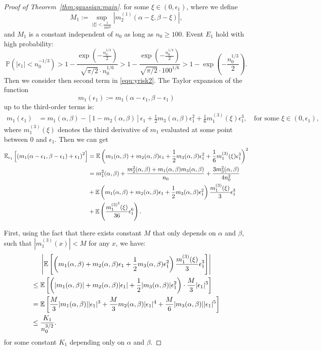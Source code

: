 \begin{proof}[Proof of Theorem~\ref{thm:gaussian:main}]
    for some \( \xi \in (0, \epsilon_1) \), where we define 
    \[
    M_1 := \sup_{|\xi| < \frac{1}{100^{\frac{1}{3}}}} \left| m_2^{(1)}(\alpha - \xi, \beta - \xi) \right|,
    \]
    and \( M_1 \) is a constant independent of \( n_0 \) as long as \( n_0 \geq 100\).
Event $E_1$ hold with high probability:
\[
\mathbb{P}\left(|\epsilon_1| < n_0^{-1/3}\right) >1- \frac{\exp\left(-\frac{n_0^{1/3}}{2}\right)}{\sqrt{\pi / 2} \cdot n_0^{1/6}} >1- \frac{\exp\left(-\frac{n_0^{1/3}}{2}\right)}{\sqrt{\pi / 2} \cdot 100^{1/6}} >  1-\exp\left(-\frac{n_0^{1/3}}{2}\right).
\]
Then we consider then second term in \ref{equ:yrisk2}. The Taylor expansion of the function
\[
m_1(\epsilon_1) := m_1(\alpha - \epsilon_1, \beta - \epsilon_1)
\]
up to the third-order terms is:
\begin{align}\label{equ:taylor}
m_1(\epsilon_1) 
&= m_1(\alpha,\beta) - \left[ 1 - m_2(\alpha, \beta) \right] \epsilon_1 +\frac{1}{2}m_3(\alpha,\beta) \epsilon_1^2 + \frac{1}{6} m_1^{(3)}(\xi) \epsilon_1^3, \quad \text{for some } \xi \in (0, \epsilon_1),
\end{align}
where \( m_1^{(3)}(\xi) \) denotes the third derivative of \(m_1\) evaluated at some point between \(0\) and \(\epsilon_1\).
Then we can get 
\begin{align}
    \mathbb{E}_{\epsilon_1} \left[ \left(m_1(\alpha - \epsilon_1, \beta - \epsilon_1) + \epsilon_1 \right)^2 \right] &= \mathbb{E}\left( m_1(\alpha,\beta) + m_2(\alpha, \beta) \epsilon_1 + \frac{1}{2}m_3(\alpha,\beta) \epsilon_1^2 + \frac{1}{6} m_1^{(3)}(\xi) \epsilon_1^3 \right)^2\notag\\
&= m_1^2(\alpha,\beta) +\frac{m_2^2(\alpha,\beta) + m_1(\alpha,\beta)m_3(\alpha,\beta)}{n_0} + \frac{3m_3^2(\alpha,\beta)}{4n^2_0} \notag \\
\qquad & + \mathbb{E}\left( m_1(\alpha,\beta) +m_2(\alpha,\beta)\epsilon_1 + \frac{1}{2}m_3(\alpha,\beta)\epsilon^2_1\right) \frac{m_1^{(3)}(\xi)}{3}\epsilon_1^3 \notag \\
\qquad & + \mathbb{E}\left( \frac{m_1^{(3)^2}(\xi)}{36}\epsilon_1^6\right). \label{equ:infinite_mse}
\end{align}

First, using the fact that there exists constant $M$ that only depends on $\alpha$ and $\beta$, such that $|m_1^{(3)}(x)| < M$ for any $x$, we have:
\begin{align}
&\left|\mathbb{E}\left[\left( m_1(\alpha,\beta) + m_2(\alpha,\beta)\epsilon_1 + \frac{1}{2}m_3(\alpha,\beta)\epsilon_1^2 \right) \frac{m_1^{(3)}(\xi)}{3} \epsilon_1^3 \right] \right| \notag \\
\leq\;& \mathbb{E}\left[\left( |m_1(\alpha,\beta)| + m_2(\alpha,\beta)|\epsilon_1| + \frac{1}{2}|m_3(\alpha,\beta)|\epsilon_1^2 \right) \cdot \frac{M}{3} |\epsilon_1|^3 \right] \notag \\
=\;& \mathbb{E}\left[ \frac{M}{3} |m_1(\alpha,\beta)| |\epsilon_1|^3 + \frac{M}{3} m_2(\alpha,\beta) |\epsilon_1|^4 + \frac{M}{6} |m_3(\alpha,\beta)| |\epsilon_1|^5 \right] \notag \\
\leq\;& \frac{K_1}{n_0^{3/2}}. \notag
\end{align}
for some constant \( K_1 \) depending only on \( \alpha \) and \( \beta \).


\end{proof}
